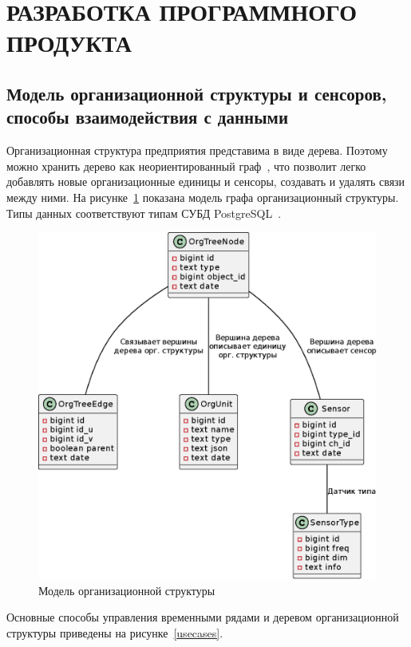 \section{РАЗРАБОТКА ПРОГРАММНОГО ПРОДУКТА}

\subsection{Модель организационной структуры и сенсоров, способы взаимодействия с данными}

Организационная структура предприятия представима в виде дерева. Поэтому можно хранить дерево как неориентированный граф~\cite{graphs}, что позволит легко добавлять новые организационные единицы и сенсоры, создавать и удалять связи между ними. На рисунке~\ref{datamodel} показана модель графа организационный структуры. Типы данных соответствуют типам СУБД PostgreSQL~\cite{pg-datatypes}.

\begin{figure}
  \includegraphics[scale=1.0]{img/datamodel.eps}
  \caption{Модель организационной структуры}
  \label{datamodel}
\end{figure}

Основные способы управления временными рядами и деревом организационной структуры приведены на рисунке~\ref{usecases}.

